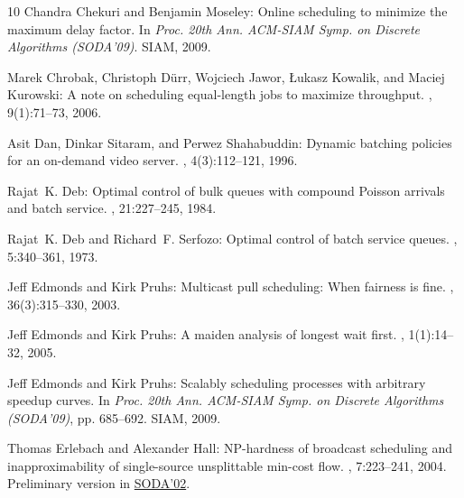 \begin{thebibliography}{10}
{\sc Chandra Chekuri and Benjamin Moseley}: Online scheduling to minimize the
  maximum delay factor.
\newblock In {\em Proc. 20th Ann. ACM-SIAM Symp. on Discrete Algorithms
  (SODA'09)}. SIAM, 2009.

{\sc Marek Chrobak, Christoph D\"{u}rr, Wojciech Jawor, {\L}ukasz Kowalik, and
  Maciej Kurowski}: A note on scheduling equal-length jobs to maximize
  throughput.
, 9(1):71--73, 2006.
\newblock [\epfmtdoi{10.1007/s10951-006-5595-4}]

{\sc Asit Dan, Dinkar Sitaram, and Perwez Shahabuddin}: Dynamic batching
  policies for an on-demand video server.
, 4(3):112--121, 1996.
\newblock [\epfmtdoi{10.1007/s005300050016}]

{\sc Rajat~K. Deb}: Optimal control of bulk queues with compound {P}oisson
  arrivals and batch service.
, 21:227--245, 1984.

{\sc Rajat~K. Deb and Richard~F. Serfozo}: Optimal control of batch service
  queues.
, 5:340--361, 1973.
\newblock [\epfmtdoi{10.2307/1426040}]

{\sc Jeff Edmonds and Kirk Pruhs}: Multicast pull scheduling: When fairness is
  fine.
, 36(3):315--330, 2003.
\newblock [\epfmtdoi{10.1007/s00453-003-1018-5}]

{\sc Jeff Edmonds and Kirk Pruhs}: A maiden analysis of longest wait first.
, 1(1):14--32, 2005.
\newblock [\epfmtdoi{10.1145/1077464.1077467}]

{\sc Jeff Edmonds and Kirk Pruhs}: Scalably scheduling processes with arbitrary
  speedup curves.
\newblock In {\em Proc. 20th Ann. ACM-SIAM Symp. on Discrete Algorithms
  (SODA'09)}, pp. 685--692. SIAM, 2009.
\newblock [\epfmtdoi{10.1145/1496770.1496845}]

{\sc Thomas Erlebach and Alexander Hall}: {NP}-hardness of broadcast scheduling
  and inapproximability of single-source unsplittable min-cost flow.
, 7:223--241, 2004.
\newblock Preliminary version in
  \href{https://dl.acm.org/citation.cfm?id=545381.545405}{SODA'02}.


\end{thebibliography}
